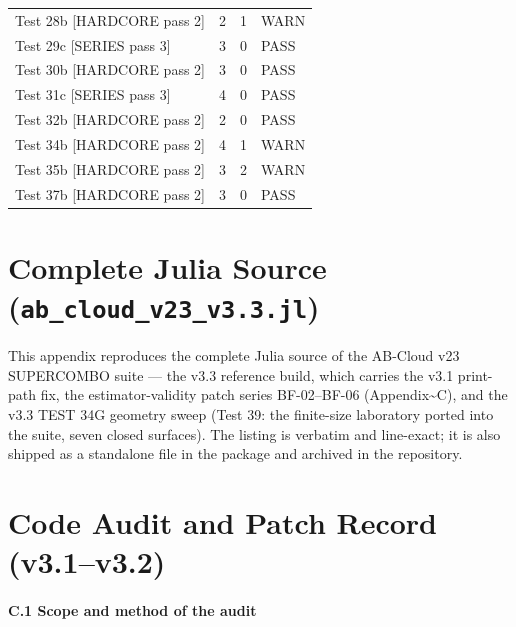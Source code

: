 \documentclass[10pt]{article}
\begin{document}
\begin{table}[htbp]
\begin{tabular}{llll}
Test 28b [HARDCORE pass 2] & 2 & 1 & WARN \\
Test 29c [SERIES pass 3] & 3 & 0 & PASS \\
Test 30b [HARDCORE pass 2] & 3 & 0 & PASS \\
Test 31c [SERIES pass 3] & 4 & 0 & PASS \\
Test 32b [HARDCORE pass 2] & 2 & 0 & PASS \\
Test 34b [HARDCORE pass 2] & 4 & 1 & WARN \\
Test 35b [HARDCORE pass 2] & 3 & 2 & WARN \\
Test 37b [HARDCORE pass 2] & 3 & 0 & PASS \\
\bottomrule
\end{tabular}
\end{table}

\section{Complete Julia Source (\texttt{ab\_cloud\_v23\_v3.3.jl})}

This appendix reproduces the complete Julia source of the AB-Cloud v23 SUPERCOMBO suite --- the v3.3 reference build, which carries the v3.1 print-path fix, the estimator-validity patch series BF-02--BF-06 (Appendix\textasciitilde{}C), and the v3.3 TEST 34G geometry sweep (Test 39: the finite-size laboratory ported into the suite, seven closed surfaces). The listing is verbatim and line-exact; it is also shipped as a standalone file in the package and archived in the repository.



\section{Code Audit and Patch Record (v3.1--v3.2)}

\paragraph{C.1 Scope and method of the audit}
\end{document}

